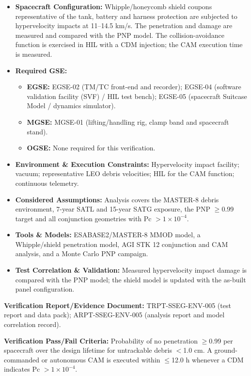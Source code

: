 \begin{itemize}
\item \textbf{Spacecraft Configuration:} Whipple/honeycomb shield coupons representative of the tank, battery and harness protection are subjected to hypervelocity impacts at 11--14.5 km/s. The penetration and damage are measured and compared with the PNP model. The collision-avoidance function is exercised in HIL with a CDM injection; the CAM execution time is measured.
\item \textbf{Required GSE:}
\begin{itemize}
\item \textbf{EGSE:} EGSE-02 (TM/TC front-end and recorder); EGSE-04 (software validation facility (SVF) / HIL test bench); EGSE-05 (spacecraft Suitcase Model / dynamics simulator).
\item \textbf{MGSE:} MGSE-01 (lifting/handling rig, clamp band and spacecraft stand).
\item \textbf{OGSE:} None required for this verification.
\end{itemize}
\item \textbf{Environment \& Execution Constraints:} Hypervelocity impact facility; vacuum; representative LEO debris velocities; HIL for the CAM function; continuous telemetry.
\item \textbf{Considered Assumptions:} Analysis covers the MASTER-8 debris environment, 7-year SATL and 15-year SATG exposure, the PNP $\ge$0.99 target and all conjunction geometries with Pc $>$$1\times10^{-4}$.
\item \textbf{Tools \& Models:} ESABASE2/MASTER-8 MMOD model, a Whipple/shield penetration model, AGI STK 12 conjunction and CAM analysis, and a Monte Carlo PNP campaign.
\item \textbf{Test Correlation \& Validation:} Measured hypervelocity impact damage is compared with the PNP model; the shield model is updated with the as-built panel configuration.
\end{itemize}
\par\textbf{Verification Report/Evidence Document:} TRPT-SSEG-ENV-005 (test report and data pack); ARPT-SSEG-ENV-005 (analysis report and model correlation record).
\par\textbf{Verification Pass/Fail Criteria:} Probability of no penetration $\ge$0.99 per spacecraft over the design lifetime for untrackable debris $<$1.0 cm. A ground-commanded or autonomous CAM is executed within $\le$12.0 h whenever a CDM indicates Pc $>$$1\times10^{-4}$.
\par\medskip
